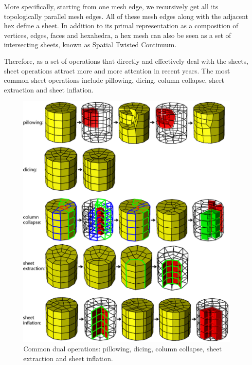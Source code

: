 \documentclass[final,5p,times,twocolumn]{elsarticle}
\begin{document}
More specifically, starting from one mesh edge, we recursively get all its topologically parallel mesh edges. All of these mesh edges along with the adjacent hex define a sheet. In addition to its primal representation as a composition of vertices, edges, faces and hexahedra, a hex mesh can also be seen as a set of intersecting sheets, known as Spatial Twisted Continuum\cite{Murdoch:1997fy}.

Therefore, as a set of operations that directly and effectively deal with the sheets, sheet operations attract more and more attention in recent years. The most common sheet operations include pillowing\cite{Mitchell:1995wa}, dicing\cite{melander1997generation}, column collapse\cite{Staten:2009bo}, sheet extraction\cite{Borden:2002hs,Staten:2009bo} and sheet inflation\cite{Ledoux:2009jz,staten2010sheet,Staten:2009bo}.

\begin{figure}[htbp]
\begin{center}
\includegraphics[width=14cm]{rev_figures/dual_operations.png}
\caption{Common dual operations: pillowing, dicing, column collapse, sheet extraction and sheet inflation.}
\label{fig:dual_operations}
\end{center}
\end{figure}
\end{document}
